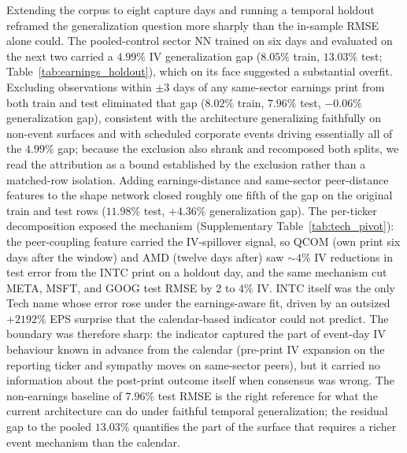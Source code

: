 Extending the corpus to eight capture days and running a temporal holdout reframed the generalization question more sharply than the in-sample RMSE alone could. The pooled-control sector NN trained on six days and evaluated on the next two carried a $4.99\%$ IV generalization gap ($8.05\%$ train, $13.03\%$ test; Table~\ref{tab:earnings_holdout}), which on its face suggested a substantial overfit. Excluding observations within $\pm 3$ days of any same-sector earnings print from both train and test eliminated that gap ($8.02\%$ train, $7.96\%$ test, $-0.06\%$ generalization gap), consistent with the architecture generalizing faithfully on non-event surfaces and with scheduled corporate events driving essentially all of the $4.99\%$ gap; because the exclusion also shrank and recomposed both splits, we read the attribution as a bound established by the exclusion rather than a matched-row isolation. Adding earnings-distance and same-sector peer-distance features to the shape network closed roughly one fifth of the gap on the original train and test rows ($11.98\%$ test, $+4.36\%$ generalization gap). The per-ticker decomposition exposed the mechanism (Supplementary Table~\ref{tab:tech_pivot}): the peer-coupling feature carried the IV-spillover signal, so QCOM (own print six days after the window) and AMD (twelve days after) saw $\sim 4\%$ IV reductions in test error from the INTC print on a holdout day, and the same mechanism cut META, MSFT, and GOOG test RMSE by 2 to $4\%$ IV. INTC itself was the only Tech name whose error rose under the earnings-aware fit, driven by an outsized $+2192\%$ EPS surprise that the calendar-based indicator could not predict. The boundary was therefore sharp: the indicator captured the part of event-day IV behaviour known in advance from the calendar (pre-print IV expansion on the reporting ticker and sympathy moves on same-sector peers), but it carried no information about the post-print outcome itself when consensus was wrong. The non-earnings baseline of $7.96\%$ test RMSE is the right reference for what the current architecture can do under faithful temporal generalization; the residual gap to the pooled $13.03\%$ quantifies the part of the surface that requires a richer event mechanism than the calendar.

